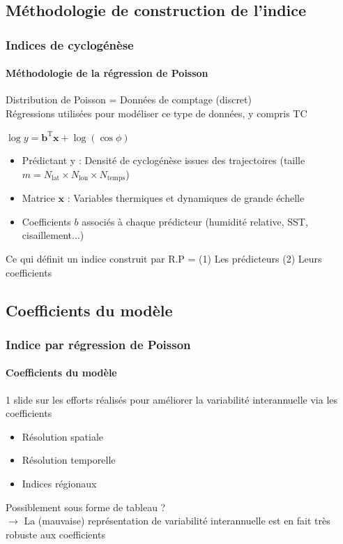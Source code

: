 \documentclass[aspectratio=169, usepdftitle=false, xcolor={dvipsnames}, 9pt,table]{beamer}
\begin{document}
\subsection[Méthodologie]{Méthodologie de construction de l'indice}
\begin{frame}[c]
    \frametitle{Indices de cyclogénèse}
    \framesubtitle{Méthodologie de la régression de Poisson}
    \footnotesize
    Distribution de Poisson = Données de comptage (discret)\\
    Régressions utilisées pour modéliser ce type de données, y compris TC
    \vspace{1em}
    \begin{center}
        \begin{minipage}{4cm}
            \begin{definition}
                \centering
                $\log y = \mathbf{b}^{\text{T}} \mathbf{x} + \log (\cos \phi)$
            \end{definition}
        \end{minipage}
    \end{center}
    \begin{itemize}
        \item Prédictant y : Densité de cyclogénèse issues des trajectoires (taille $m = N_{\text{lat}} \times N_{\text{lon}} \times N_{\text{temps}}$)
        \item Matrice $\mathbf{x}$ : Variables thermiques et dynamiques de grande échelle
        \item Coefficients $b$ associés à chaque prédicteur (humidité relative, SST, cisaillement...)
    \end{itemize}
    \vspace{1em}
    Ce qui définit un indice construit par R.P = (1) Les prédicteurs (2) Leurs coefficients
\end{frame}

\subsection{Coefficients du modèle}
\begin{frame}
    \frametitle{Indice par régression de Poisson}
    \framesubtitle{Coefficients du modèle}

    1 slide sur les efforts réalisés pour améliorer la variabilité interannuelle via les coefficients
    \begin{itemize}
        \item Résolution spatiale
        \item Résolution temporelle
        \item Indices régionaux
    \end{itemize}
    \vspace{1em}
    Possiblement sous forme de tableau ?\\
    $\longrightarrow$ La (mauvaise) représentation de variabilité interannuelle est en fait très robuste aux coefficients
\end{frame}
\end{document}
